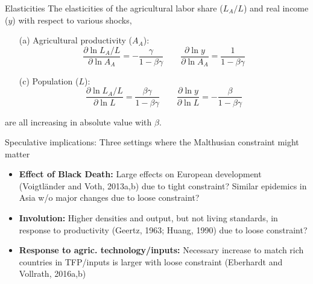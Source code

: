 \documentclass[10pt, xcolor=dvipsnames]{beamer}
\begin{document}
\begin{frame}{Elasticities}
The elasticities of the agricultural labor share ($L_A/L$) and real income ($y$) with respect to various shocks,
\begin{enumerate}
  \item[(a)] Agricultural productivity ($A_A$): 
\begin{equation}
  \frac{\partial \ln L_A/L}{\partial \ln A_A} = - \frac{\gamma}{1-\beta\gamma} \quad \quad \frac{\partial \ln y}{\partial \ln A_A} = \frac{1}{1-\beta\gamma}
\end{equation}
  \item[(c)] Population ($L$): 
\begin{equation}
  \frac{\partial \ln L_A/L}{\partial \ln L} = \frac{\beta\gamma}{1-\beta\gamma} \quad \quad \frac{\partial \ln y}{\partial \ln L} = - \frac{\beta}{1-\beta\gamma}
\end{equation}
\end{enumerate}
are all increasing in absolute value with $\beta$.
\end{frame}

\begin{frame}{Speculative implications:}
Three settings where the Malthusian constraint might matter
\begin{itemize}
  \item \textbf{Effect of Black Death:} Large effects on European development (Voigtl{\"a}nder and Voth, 2013a,b) due to tight constraint? Similar epidemics in Asia w/o major changes due to loose constraint?
  \item \textbf{Involution:} Higher densities and output, but not living standards, in response to productivity (Geertz, 1963; Huang, 1990) due to loose constraint?
  \item \textbf{Response to agric. technology/inputs:} Necessary increase to match rich countries in TFP/inputs is larger with loose constraint (Eberhardt and Vollrath, 2016a,b)
\end{itemize}
\end{frame}
\end{document}
